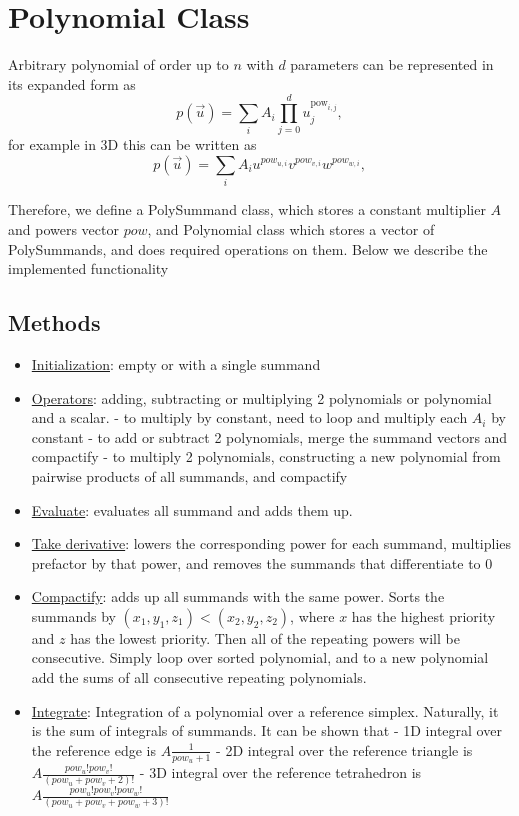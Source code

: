\section{Polynomial Class}

\noindent
Arbitrary polynomial of order up to $n$ with $d$ parameters can be represented in its expanded form as
\[ p(\vec{u}) = \sum_i A_i \prod_{j = 0}^d u_j^{\mathrm{pow}_{i,j}},  \]
for example in 3D this can be written as
\[ p(\vec{u}) = \sum_i A_i u^{pow_{u,i}} v^{pow_{v,i}} w^{pow_{w, i}},  \]

\noindent
Therefore, we define a PolySummand class, which stores a constant multiplier $A$ and powers vector $pow$, and Polynomial class
which stores a vector of PolySummands, and does required operations on them. Below we describe the implemented functionality

\subsection{Methods}

\begin{itemize}
	\item \uline{Initialization}: empty or with a single summand
	\item \uline{Operators}: adding, subtracting or multiplying 2 polynomials or polynomial and a scalar.
		\subitem - to multiply by constant, need to loop and multiply each $A_i$ by constant
		\subitem - to add or subtract 2 polynomials, merge the summand vectors and compactify
		\subitem - to multiply 2 polynomials, constructing a new polynomial from pairwise products of all summands, and compactify
	\item \uline{Evaluate}: evaluates all summand and adds them up.
	\item \uline{Take derivative}: lowers the corresponding power for each summand, multiplies prefactor by that power, and removes the summands that differentiate to 0
	\item \uline{Compactify}: adds up all summands with the same power. Sorts the summands by $(x_1,y_1,z_1) < (x_2, y_2, z_2)$, where $x$ has the highest priority and $z$ has the lowest priority. Then all of the repeating powers will be consecutive. Simply loop over sorted polynomial, and to a new polynomial add the sums of all consecutive repeating polynomials.
	\item \uline{Integrate}: Integration of a polynomial over a reference simplex. Naturally, it is the sum of integrals of summands. It can be shown that
		\subitem - 1D integral over the reference edge is $A \frac{1}{pow_u + 1}$
		\subitem - 2D integral over the reference triangle is $A \frac{pow_u! pow_v!}{(pow_u + pow_v + 2)!}$
		\subitem - 3D integral over the reference tetrahedron is $A \frac{pow_u! pow_v! pow_w!}{(pow_u + pow_v + pow_w + 3)!}$
\end{itemize}


